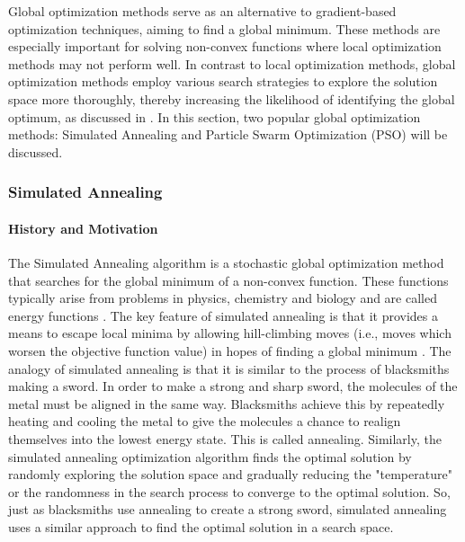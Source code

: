 Global optimization methods serve as an alternative to gradient-based optimization techniques, aiming to find a global minimum. These methods are especially important for solving non-convex functions where local optimization methods may not perform well. In contrast to local optimization methods, global optimization methods employ various search strategies to explore the solution space more thoroughly, thereby increasing the likelihood of identifying the global optimum, as discussed in \cite[1-5]{horst1995handbook}. In this section, two popular global optimization methods: Simulated Annealing and Particle Swarm Optimization (PSO) will be discussed.

\subsubsection{Simulated Annealing}
\paragraph{History and Motivation}
The Simulated Annealing algorithm is a stochastic global optimization method that searches for the global minimum of a non-convex function. These functions typically arise from problems in physics, chemistry and biology and are called energy functions \cite[1]{XIANG1997216}. The key feature of simulated annealing is that it provides a means to escape local minima by allowing hill-climbing moves (i.e., moves which worsen the objective function value) in hopes of finding a global minimum \cite{Henderson2003}. The analogy of simulated annealing is that it is similar to the process of blacksmiths making a sword. In order to make a strong and sharp sword, the molecules of the metal must be aligned in the same way. Blacksmiths achieve this by repeatedly heating and cooling the metal to give the molecules a chance to realign themselves into the lowest energy state. This is called annealing. Similarly, the simulated annealing optimization algorithm finds the optimal solution by randomly exploring the solution space and gradually reducing the "temperature" or the randomness in the search process to converge to the optimal solution. So, just as blacksmiths use annealing to create a strong sword, simulated annealing uses a similar approach to find the optimal solution in a search space. 
